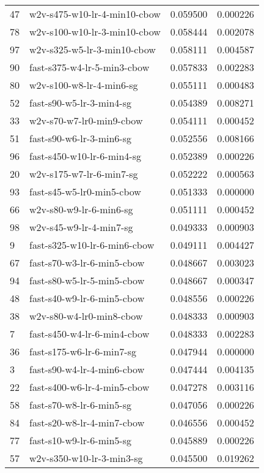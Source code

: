 {\begin{tabular}{llrr}
47 &  w2v-s475-w10-lr-4-min10-cbow &  0.059500 &  0.000226 \\
78 &  w2v-s100-w10-lr-3-min10-cbow &  0.058444 &  0.002078 \\
97 &   w2v-s325-w5-lr-3-min10-cbow &  0.058111 &  0.004587 \\
90 &   fast-s375-w4-lr-5-min3-cbow &  0.057833 &  0.002283 \\
80 &      w2v-s100-w8-lr-4-min6-sg &  0.055111 &  0.000483 \\
52 &      fast-s90-w5-lr-3-min4-sg &  0.054389 &  0.008271 \\
33 &      w2v-s70-w7-lr0-min9-cbow &  0.054111 &  0.000452 \\
51 &      fast-s90-w6-lr-3-min6-sg &  0.052556 &  0.008166 \\
96 &    fast-s450-w10-lr-6-min4-sg &  0.052389 &  0.000226 \\
20 &      w2v-s175-w7-lr-6-min7-sg &  0.052222 &  0.000563 \\
93 &     fast-s45-w5-lr0-min5-cbow &  0.051333 &  0.000000 \\
66 &       w2v-s80-w9-lr-6-min6-sg &  0.051111 &  0.000452 \\
98 &       w2v-s45-w9-lr-4-min7-sg &  0.049333 &  0.000903 \\
9  &  fast-s325-w10-lr-6-min6-cbow &  0.049111 &  0.004427 \\
67 &    fast-s70-w3-lr-6-min5-cbow &  0.048667 &  0.003023 \\
94 &    fast-s80-w5-lr-5-min5-cbow &  0.048667 &  0.000347 \\
48 &    fast-s40-w9-lr-6-min5-cbow &  0.048556 &  0.000226 \\
38 &      w2v-s80-w4-lr0-min8-cbow &  0.048333 &  0.000903 \\
7  &   fast-s450-w4-lr-6-min4-cbow &  0.048333 &  0.002283 \\
36 &     fast-s175-w6-lr-6-min7-sg &  0.047944 &  0.000000 \\
3  &    fast-s90-w4-lr-4-min6-cbow &  0.047444 &  0.004135 \\
22 &   fast-s400-w6-lr-4-min5-cbow &  0.047278 &  0.003116 \\
58 &      fast-s70-w8-lr-6-min5-sg &  0.047056 &  0.000226 \\
84 &    fast-s20-w8-lr-4-min7-cbow &  0.046556 &  0.000452 \\
77 &      fast-s10-w9-lr-6-min5-sg &  0.045889 &  0.000226 \\
57 &     w2v-s350-w10-lr-3-min3-sg &  0.045500 &  0.019262 \\

\end{tabular}}
